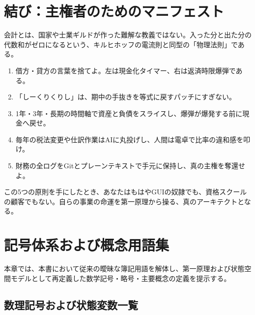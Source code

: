 \documentclass[11pt, a4paper]{report}
\begin{document}
\chapter*{結び：主権者のためのマニフェスト}

会計とは、国家や士業ギルドが作った難解な教義ではない。入った分と出た分の代数和がゼロになるという、キルヒホッフの電流則と同型の「物理法則」である。

\begin{enumerate}
    \item 借方・貸方の言葉を捨てよ。左は現金化タイマー、右は返済時限爆弾である。
    \item 「しーくりくりし」は、期中の手抜きを等式に戻すパッチにすぎない。
    \item 1年・3年・長期の時間軸で資産と負債をスライスし、爆弾が爆発する前に現金へ戻せ。
    \item 毎年の税法変更や仕訳作業はAIに丸投げし、人間は電卓で比率の違和感を叩け。
    \item 財務の全ログをGitとプレーンテキストで手元に保持し、真の主権を奪還せよ。
\end{enumerate}

この5つの原則を手にしたとき、あなたはもはやGUIの奴隷でも、資格スクールの顧客でもない。自らの事業の命運を第一原理から操る、真のアーキテクトとなる。

\appendix
\chapter{記号体系および概念用語集}
\label{chap:symbols_and_glossary}

本章では、本書において従来の曖昧な簿記用語を解体し、第一原理および状態空間モデルとして再定義した数学記号・略号・主要概念の定義を提示する。

\section{数理記号および状態変数一覧}
\end{document}

